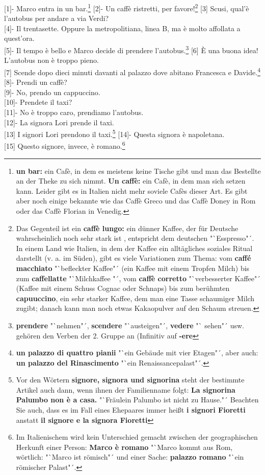\documentclass{article}
\begin{document}
{[1]}- Marco entra in un bar.\footnote{\textbf{un bar:} ein Cafè,
in dem es meistens keine Tische gibt und man das Bestellte an der Theke zu
sich nimmt. \textbf{Un caffè:} ein Cafè, in dem man sich setzen kann. Leider
gibt es in Italien nicht mehr soviele Cafès dieser Art. Es gibt aber noch
einige bekannte wie das Caffè Greco und das Caffè Doney in Rom oder das Caffè
Florian in Venedig.}
{[2]}- Un caffè ristretti, per favore!\footnote{Das Gegenteil ist ein \textbf{caffè
lungo:} ein dünner Kaffee, der für Deutsche wahrscheinlich noch sehr stark ist
, entspricht dem deutschen "`Esspresso"´. In einem Land wie Italien, in dem
der Kaffee ein alltägliches soziales Ritual darstellt (v. a. im Süden), gibt es
viele Variationen zum Thema: vom \textbf{caffé macchiato} "`befleckter Kaffee"´
(ein Kaffee mit einem Tropfen Milch) bis zum \textbf{caffellatte} "`Milchkaffee
"´, vom \textbf{caffè corretto} "`verbesserter Kaffee"´ (Kaffee mit einem
Schuss Cognac oder Schnaps) bis zum berühmten \textbf{capuuccino}, ein sehr
starker Kaffee, dem man eine Tasse schaumiger Milch zugibt; danach kann man
noch etwas Kakaopulver auf den Schaum streuen.}
{[3]} Scusi, qual'è l'autobus per andare a via Verdi?\\
{[4]}- Il trentasette. Oppure la metropolitiana, linea B, ma è molto affollata
a quest'ora.\\
{[5]}- Il tempo è bello e Marco decide di prendere l'autobus.\footnote{\textbf{
    prendere} "`nehmen"´, \textbf{scendere} "`austeigen"´, \textbf{vedere} "`
sehen"´ usw. gehören den Verben der 2. Gruppe an (Infinitiv auf \textbf{-ere}}
{[6]} È una buona idea! L'autobus non è troppo pieno.\\
{[7]} Scende dopo dieci minuti davanti al palazzo dove abitano Francesca e
Davide.\footnote{\textbf{un palazzo di quattro pianii} "`ein Gebäude mit vier
Etagen"´, aber auch: \textbf{un palazzo del Rinascimento}
"`ein Renaissancepalast"´.}
{[8]}- Prendi un caffè?\\
{[9]}- No, prendo un cappuccino.\\
{[10]}- Prendete il taxi?\\
{[11]}- No è troppo caro, prendiamo l'autobus.\\
{[12]}- La signora Lori prende il taxi.\\
{[13]} I signori Lori prendono il taxi.\footnote{Vor den Wörtern \textbf{signore,
signora und signorina} steht der bestimmte Artikel auch dann, wenn ihnen der
Familienname folgt: \textbf{La signorina Palumbo non è a casa.} "`Fräulein
Palumbo ist nicht zu Hause."´ Beachten Sie auch, dass es im Fall eines
Ehepaares immer heißt \textbf{i signori Fioretti} anstatt \textbf{il signore e
la signora Fioretti}}
{[14]}- Questa signora è napoletana.\\
{[15]} Questo signore, invece, è romano.\footnote{Im Italienischem wird kein
Unterschied gemacht zwischen der geographischen Herkunft einer Person: \textbf{
Marco è romano} "`Marco kommt aus Rom, wörtlich: "`Marco ist römisch"´ und
einer Sache: \textbf{palazzo romano} "`ein römischer Palast"´.}
\end{document}
